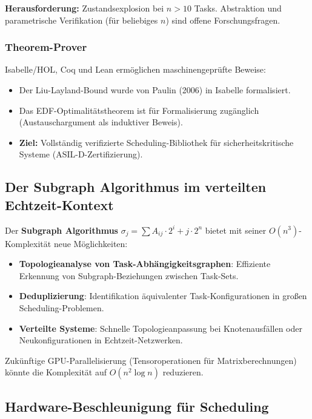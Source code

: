 ﻿\documentclass[a4paper,12pt]{report}
\theoremstyle{definition}
\begin{document}
\textbf{Herausforderung:} Zustandsexplosion bei $n > 10$ Tasks.
Abstraktion und parametrische Verifikation (für beliebiges $n$) sind
offene Forschungsfragen.

\subsubsection{Theorem-Prover}

Isabelle/HOL, Coq und Lean ermöglichen maschinengeprüfte Beweise:
\begin{itemize}
	\item Der Liu-Layland-Bound wurde von Paulin (2006) in Isabelle formalisiert.
	\item Das EDF-Optimalitätstheorem ist für Formalisierung zugänglich
	      (Austauschargument als induktiver Beweis).
	\item \textbf{Ziel:} Vollständig verifizierte Scheduling-Bibliothek für
	      sicherheitskritische Systeme (ASIL-D-Zertifizierung).
\end{itemize}

\subsection{Der Subgraph Algorithmus im verteilten Echtzeit-Kontext}

Der \textbf{Subgraph Algorithmus} $\sigma_j = \sum A_{ij} \cdot 2^i + j \cdot 2^n$
\cite{Epp2026} bietet mit seiner $O(n^3)$-Komplexität neue Möglichkeiten:

\begin{itemize}
	\item \textbf{Topologieanalyse von Task-Abhängigkeitsgraphen}: Effiziente
	      Erkennung von Subgraph-Beziehungen zwischen Task-Sets.
	\item \textbf{Deduplizierung}: Identifikation äquivalenter Task-Konfigurationen
	      in großen Scheduling-Problemen.
	\item \textbf{Verteilte Systeme}: Schnelle Topologieanpassung bei Knotenausfällen
	      oder Neukonfigurationen in Echtzeit-Netzwerken.
\end{itemize}

Zukünftige GPU-Parallelisierung (Tensoroperationen für Matrixberechnungen)
könnte die Komplexität auf $O(n^2 \log n)$ reduzieren.

\subsection{Hardware-Beschleunigung für Scheduling}
\end{document}
